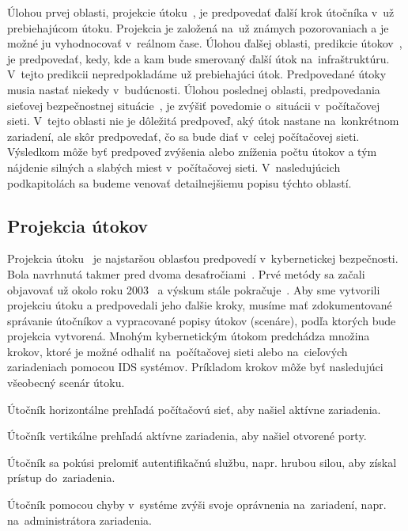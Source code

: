\documentclass[thesismargins, thesislinespacing, openright, upjsfrontpage]{rnthesis}
\begin{document}
Úlohou prvej oblasti, projekcie útoku~\cite{Yang2014}, je predpovedať ďalší krok útočníka v~už prebiehajúcom útoku. Projekcia je založená na~už známych pozorovaniach a je možné ju vyhodnocovať v~reálnom čase. Úlohou ďalšej oblasti, predikcie útokov~\cite{Abdlhamed2017}, je predpovedať, kedy, kde a kam bude smerovaný ďalší útok na~infraštruktúru. V~tejto predikcii nepredpokladáme už prebiehajúci útok. Predpovedané útoky musia nastať niekedy v~budúcnosti. Úlohou poslednej oblasti, predpovedania sieťovej bezpečnostnej situácie~\cite{wei2013comprehensive,Leau2015}, je zvýšiť povedomie o~situácii v~počítačovej sieti. V~tejto oblasti nie je dôležitá predpoveď, aký útok nastane na~konkrétnom zariadení, ale skôr predpovedať, čo sa bude diať v~celej počítačovej sieti. Výsledkom môže byť predpoveď zvýšenia alebo zníženia počtu útokov a tým nájdenie silných a slabých miest v~počítačovej sieti. V~nasledujúcich podkapitolách sa budeme venovať detailnejšiemu popisu týchto oblastí.

\subsection{Projekcia útokov}

Projekcia útoku~\cite{Yang2014} je najstaršou oblasťou predpovedí v~kybernetickej bezpečnosti. Bola navrhnutá takmer pred dvoma desaťročiami~\cite{geib2001plan}. Prvé metódy sa začali objavovať už okolo roku 2003~\cite{hughes2003attack,qin2004attack} a výskum stále pokračuje~\cite{ahmed2017attack,zhang2019intrusion}. Aby sme vytvorili projekciu útoku a predpovedali jeho ďalšie kroky, musíme mať zdokumentované správanie útočníkov a vypracované popisy útokov (scenáre), podľa ktorých bude projekcia vytvorená. Mnohým kybernetickým útokom predchádza množina krokov, ktoré je možné odhaliť na~počítačovej sieti alebo na~cieľových zariadeniach pomocou IDS systémov. Príkladom krokov môže byť nasledujúci všeobecný scenár útoku.

\begin{compactenum}
    \item Útočník horizontálne prehľadá počítačovú sieť, aby našiel aktívne zariadenia.
    \item Útočník vertikálne prehľadá aktívne zariadenia, aby našiel otvorené porty.
    \item Útočník sa pokúsi prelomiť autentifikačnú službu, napr. hrubou silou, aby získal prístup do~zariadenia.
    \item Útočník pomocou chyby v~systéme zvýši svoje oprávnenia na~zariadení, napr. na~administrátora zariadenia.
\end{compactenum}
\end{document}
